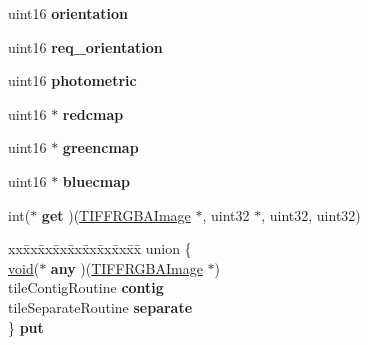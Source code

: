 \begin{DoxyCompactItemize}
uint16 {\bfseries orientation}
\item 
\mbox{\label{struct___t_i_f_f_r_g_b_a_image_a7926d71e43f85907514a54a0d9a1500e}} 
uint16 {\bfseries req\+\_\+orientation}
\item 
\mbox{\label{struct___t_i_f_f_r_g_b_a_image_a47fca3868cd7d6a2cbdcf51d5e844188}} 
uint16 {\bfseries photometric}
\item 
\mbox{\label{struct___t_i_f_f_r_g_b_a_image_a9406c23da1c2e6565d181fe01c43e548}} 
uint16 $\ast$ {\bfseries redcmap}
\item 
\mbox{\label{struct___t_i_f_f_r_g_b_a_image_adcf36394051b1766605486ba539ebc8a}} 
uint16 $\ast$ {\bfseries greencmap}
\item 
\mbox{\label{struct___t_i_f_f_r_g_b_a_image_a34950943c206a70cd6dc16faeac78e6b}} 
uint16 $\ast$ {\bfseries bluecmap}
\item 
\mbox{\label{struct___t_i_f_f_r_g_b_a_image_aedc964d8211bfed5a79ccbed51022ef0}} 
int($\ast$ {\bfseries get} )(\hyperlink{struct___t_i_f_f_r_g_b_a_image}{T\+I\+F\+F\+R\+G\+B\+A\+Image} $\ast$, uint32 $\ast$, uint32, uint32)
\item 
\mbox{\label{struct___t_i_f_f_r_g_b_a_image_ad856830e5d55c100a488457007a4a2d4}} 
\begin{tabbing}
xx\=xx\=xx\=xx\=xx\=xx\=xx\=xx\=xx\=\kill
union \{\\
\>\hyperlink{interfacevoid}{void}($\ast$ {\bfseries any} )(\hyperlink{struct___t_i_f_f_r_g_b_a_image}{TIFFRGBAImage} $\ast$)\\
\>tileContigRoutine {\bfseries contig}\\
\>tileSeparateRoutine {\bfseries separate}\\
\} {\bfseries put}\\


\end{tabbing}
\end{DoxyCompactItemize}
